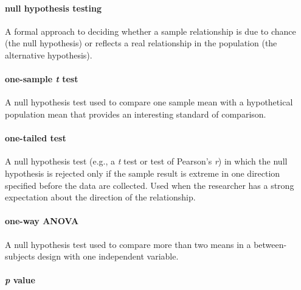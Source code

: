\documentclass[
]{krantz}
\begin{document}
\hypertarget{null-hypothesis-testing}{%
\paragraph*{null hypothesis testing}\label{null-hypothesis-testing}}

A formal approach to deciding whether a sample relationship is due to chance (the null hypothesis) or reflects a real relationship in the population (the alternative hypothesis).

\hypertarget{one-sample-t-test-1}{%
\paragraph*{\texorpdfstring{one-sample \emph{t} test}{one-sample t test}}\label{one-sample-t-test-1}}

A null hypothesis test used to compare one sample mean with a hypothetical population mean that provides an interesting standard of comparison.

\hypertarget{one-tailed-test}{%
\paragraph*{one-tailed test}\label{one-tailed-test}}

A null hypothesis test (e.g., a \emph{t} test or test of Pearson's \emph{r}) in which the null hypothesis is rejected only if the sample result is extreme in one direction specified before the data are collected. Used when the researcher has a strong expectation about the direction of the relationship.

\hypertarget{one-way-anova-1}{%
\paragraph*{one-way ANOVA}\label{one-way-anova-1}}

A null hypothesis test used to compare more than two means in a between-subjects design with one independent variable.

\hypertarget{p-value}{%
\paragraph*{\texorpdfstring{\emph{p} value}{p value}}\label{p-value}}
\end{document}
